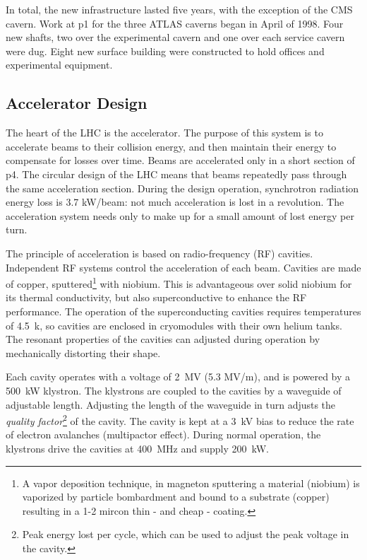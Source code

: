 In total, the new infrastructure lasted five years, with the exception of the CMS cavern.
Work at p1 for the three ATLAS caverns began in April of 1998.
Four new shafts, two over the experimental cavern and one over each service cavern were dug.
Eight new surface building were constructed to hold offices and experimental equipment.

\subsection{Accelerator Design}
The heart of the LHC is the accelerator.
The purpose of this system is to accelerate beams to their collision energy, and then maintain their energy to compensate for losses over time.
Beams are accelerated only in a short section of p4.
The circular design of the LHC means that beams repeatedly pass through the same acceleration section.
During the design operation, synchrotron radiation energy loss is 3.7 kW/beam: not much acceleration is lost in a revolution.
The acceleration system needs only to make up for a small amount of lost energy per turn.

The principle of acceleration is based on radio-frequency (RF) cavities.
Independent RF systems control the acceleration of each beam.
Cavities are made of copper, sputtered\footnote{A vapor deposition technique, in magneton sputtering a material (niobium) is vaporized by particle bombardment and bound to a substrate (copper) resulting in a 1-2 mircon thin - and cheap - coating.} with niobium.
This is advantageous over solid niobium for its thermal conductivity, but also superconductive to enhance the RF performance.\cite{lyndon}
The operation of the superconducting cavities requires temperatures of 4.5~k, so cavities are enclosed in cryomodules with their own helium tanks. \cite{boussard}
The resonant properties of the cavities can adjusted during operation by mechanically distorting their shape.

Each cavity operates with a voltage of 2~MV (5.3 MV/m), and is powered by a 500~kW klystron.
The klystrons are coupled to the cavities by a waveguide of adjustable length.
Adjusting the length of the waveguide in turn adjusts the \emph{quality factor}\footnote{Peak energy lost per cycle, which can be used to adjust the peak voltage in the cavity.} of the cavity.
The cavity is kept at a 3~kV bias to reduce the rate of electron avalanches (multipactor effect).
During normal operation, the klystrons drive the cavities at 400~MHz and supply 200~kW.

